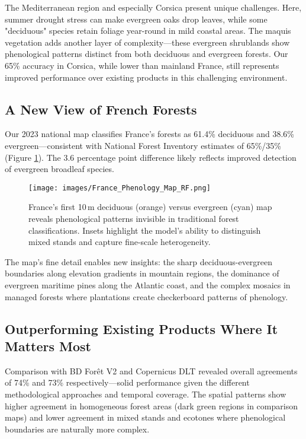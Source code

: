 \documentclass[utf8]{FrontiersinHarvard}
\begin{document}
The Mediterranean region and especially Corsica present unique challenges. Here, summer drought stress can make evergreen oaks drop leaves, while some "deciduous" species retain foliage year-round in mild coastal areas. The maquis vegetation adds another layer of complexity—these evergreen shrublands show phenological patterns distinct from both deciduous and evergreen forests. Our 65\% accuracy in Corsica, while lower than mainland France, still represents improved performance over existing products in this challenging environment.

\subsection{A New View of French Forests}

Our 2023 national map classifies France's forests as 61.4\% deciduous and 38.6\% evergreen—consistent with National Forest Inventory estimates of 65\%/35\% (Figure \ref{fig:national_map}). The 3.6 percentage point difference likely reflects improved detection of evergreen broadleaf species.

\begin{figure}[H]
    \centering
    \texttt{[image: images/France\_Phenology\_Map\_RF.png]}
    \caption{France's first 10\,m deciduous (orange) versus evergreen (cyan) map reveals phenological patterns invisible in traditional forest classifications. Insets highlight the model's ability to distinguish mixed stands and capture fine-scale heterogeneity.}
    \label{fig:national_map}
\end{figure}

The map's fine detail enables new insights: the sharp deciduous-evergreen boundaries along elevation gradients in mountain regions, the dominance of evergreen maritime pines along the Atlantic coast, and the complex mosaics in managed forests where plantations create checkerboard patterns of phenology.

\subsection{Outperforming Existing Products Where It Matters Most}

Comparison with BD Forêt V2 and Copernicus DLT revealed overall agreements of 74\% and 73\% respectively—solid performance given the different methodological approaches and temporal coverage. The spatial patterns show higher agreement in homogeneous forest areas (dark green regions in comparison maps) and lower agreement in mixed stands and ecotones where phenological boundaries are naturally more complex.
\end{document}

